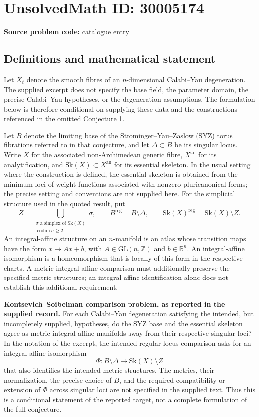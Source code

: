 \documentclass[11pt]{article}
\newcommand{\Z}{\mathbb{Z}}
\newcommand{\R}{\mathbb{R}}
\begin{document}
\section*{UnsolvedMath ID: 30005174}
\textbf{Source problem code:} catalogue entry
\subsection{Definitions and mathematical statement}
Let \(X_t\) denote the smooth fibres of an \(n\)-dimensional Calabi--Yau degeneration. The supplied excerpt does not specify the base field, the parameter domain, the precise Calabi--Yau hypotheses, or the degeneration assumptions. The formulation below is therefore conditional on supplying these data and the constructions referenced in the omitted Conjecture 1.

Let \(B\) denote the limiting base of the Strominger--Yau--Zaslow (SYZ) torus fibrations referred to in that conjecture, and let \(\Delta\subset B\) be its singular locus. Write \(X\) for the associated non-Archimedean generic fibre, \(X^{\mathrm{an}}\) for its analytification, and \(\mathrm{Sk}(X)\subset X^{\mathrm{an}}\) for its essential skeleton. In the usual setting where the construction is defined, the essential skeleton is obtained from the minimum loci of weight functions associated with nonzero pluricanonical forms; the precise setting and conventions are not supplied here. For the simplicial structure used in the quoted result, put
\[
Z=\bigcup_{\substack{\sigma\text{ a simplex of }\mathrm{Sk}(X)\\ \operatorname{codim}\sigma\geq 2}}\sigma,
\qquad
B^{\mathrm{reg}}=B\setminus\Delta,
\qquad
\mathrm{Sk}(X)^{\mathrm{reg}}=\mathrm{Sk}(X)\setminus Z.
\]
An integral-affine structure on an \(n\)-manifold is an atlas whose transition maps have the form \(x\mapsto Ax+b\), with \(A\in\mathrm{GL}(n,\Z)\) and \(b\in\R^n\). An integral-affine isomorphism is a homeomorphism that is locally of this form in the respective charts. A metric integral-affine comparison must additionally preserve the specified metric structures; an integral-affine identification alone does not establish this additional requirement.

\textbf{Kontsevich--Soibelman comparison problem, as reported in the supplied record.}
For each Calabi--Yau degeneration satisfying the intended, but incompletely supplied, hypotheses, do the SYZ base and the essential skeleton agree as metric integral-affine manifolds away from their respective singular loci? In the notation of the excerpt, the intended regular-locus comparison asks for an integral-affine isomorphism
\[
\Phi:B\setminus\Delta\longrightarrow\mathrm{Sk}(X)\setminus Z
\]
that also identifies the intended metric structures. The metrics, their normalization, the precise choice of \(B\), and the required compatibility or extension of \(\Phi\) across singular loci are not specified in the supplied text. Thus this is a conditional statement of the reported target, not a complete formulation of the full conjecture.
\end{document}
